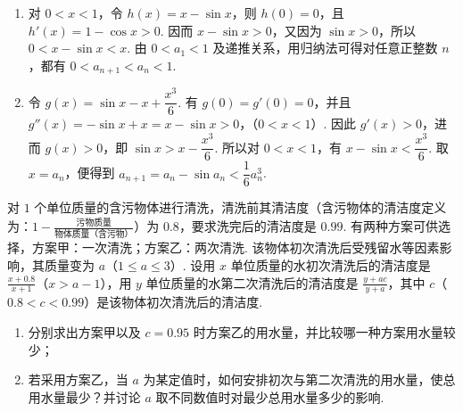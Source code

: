 \begin{solution}
\begin{enumerate}
\item 对 \(0<x<1\)，令 \(h(x)=x-\sin x\)，则 \(h(0)=0\)，且 \(h'(x)=1-\cos x>0\). 因而 \(x-\sin x>0\)，又因为 \(\sin x>0\)，所以 \(0<x-\sin x<x\). 由 \(0<a_1<1\) 及递推关系，用归纳法可得对任意正整数 \(n\)，都有 \(0<a_{n+1}<a_n<1\).

\item 令 \(g(x)=\sin x-x+\dfrac{x^{3}}{6}\). 有 \(g(0)=g'(0)=0\)，并且
\(g''(x)=-\sin x+x=x-\sin x>0\)，（\(0<x<1\)）.
因此 \(g'(x)>0\)，进而 \(g(x)>0\)，即 \(\sin x>x-\dfrac{x^{3}}{6}\). 所以对 \(0<x<1\)，有 \(x-\sin x<\dfrac{x^{3}}{6}\). 取 \(x=a_n\)，便得到 \(a_{n+1}=a_n-\sin a_n<\dfrac{1}{6}a_n^{3}\).
\end{enumerate}
\end{solution}

\begin{problem}
对 \(1\) 个单位质量的含污物体进行清洗，清洗前其清洁度（含污物体的清洁度定义为：\(1 - \frac{\text{污物质量}}{\text{物体质量（含污物）}}\)）为 \(0.8\)，要求洗完后的清洁度是 \(0.99\). 有两种方案可供选择，方案甲：一次清洗；方案乙：两次清洗. 该物体初次清洗后受残留水等因素影响，其质量变为 \(a\)（\(1 \leqslant a \leqslant 3\)）. 设用 \(x\) 单位质量的水初次清洗后的清洁度是 \(\frac{x + 0.8}{x + 1}\)（\(x > a - 1\)），用 \(y\) 单位质量的水第二次清洗后的清洁度是 \(\frac{y + ac}{y + a}\)，其中 \(c\)（\(0.8 < c < 0.99\)）是该物体初次清洗后的清洁度.

\begin{enumerate}
\item 分别求出方案甲以及 \(c = 0.95\) 时方案乙的用水量，并比较哪一种方案用水量较少；
\item 若采用方案乙，当 \(a\) 为某定值时，如何安排初次与第二次清洗的用水量，使总用水量最少？并讨论 \(a\) 取不同数值时对最少总用水量多少的影响.
\end{enumerate}
\end{problem}

